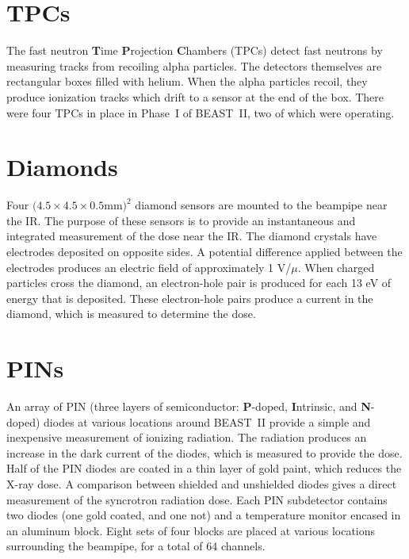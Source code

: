 \section{TPCs}
\label{sec:TPCs}
	
	The fast neutron \textbf{T}ime \textbf{P}rojection \textbf{C}hambers (TPCs) detect fast neutrons by measuring tracks from recoiling alpha particles. The detectors themselves are rectangular boxes filled with helium. When the alpha particles recoil, they produce ionization tracks which drift to a sensor at the end of the box. There were four TPCs in place in Phase~I of BEAST~II, two of which were operating. 



\section{Diamonds}

	Four $(4.5\times4.5\times0.5$mm$)^2$ diamond sensors are mounted to the beampipe near the IR. The purpose of these sensors is to provide an instantaneous and integrated measurement of the dose near the IR. The diamond crystals have electrodes deposited on opposite sides. A potential difference applied between the electrodes produces an electric field of approximately 1 V/$\mu $. When charged particles cross the diamond, an electron-hole pair is produced for each 13 eV of energy that is deposited. These electron-hole pairs produce a current in the diamond, which is measured to determine the dose.


\section{PINs}

	An array of PIN (three layers of semiconductor: \textbf{P}-doped, \textbf{I}ntrinsic, and \textbf{N}-doped) diodes at various locations around BEAST~II provide a simple and inexpensive measurement of ionizing radiation. The radiation produces an increase in the dark current of the diodes, which is measured to provide the dose. Half of the PIN diodes are coated in a thin layer of gold paint, which reduces the X-ray dose. A comparison between shielded and unshielded diodes gives a direct measurement of the syncrotron radiation dose. Each PIN subdetector contains two diodes (one gold coated, and one not) and a temperature monitor encased in an aluminum block. Eight sets of four blocks are placed at various locations surrounding the beampipe, for a total of 64 channels.

